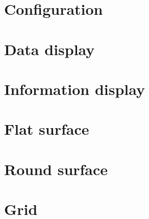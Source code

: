 \section{Configuration} {
\label{sec:configuration}



}

\section{Data display} {
\label{sec:data_display}



}

\section{Information display} {
\label{sec:information_display}


}

\section{Flat surface} {
\label{sec:flat_surface}
	
}

\section{Round surface} {
\label{sec:round_surface}
	
}

\section{Grid} {
\label{sec:grid}
	
}

